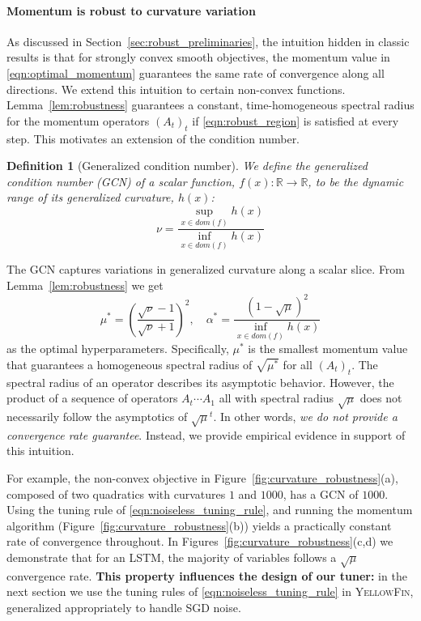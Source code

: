 \documentclass{article}
\newtheorem{definition}[theorem]{Definition}
\newcommand{\mat}[1]{\bm{\mathit{#1}}}
\newcommand{\tuner}{\textsc{YellowFin}\xspace}
\begin{document}
\paragraph{Momentum is robust to curvature variation}
\label{sec:curvature_robustness}

As discussed in Section~\ref{sec:robust_preliminaries}, the intuition hidden in classic results
is that for strongly convex smooth objectives, the momentum value in \eqref{eqn:optimal_momentum} guarantees the same rate of convergence along all directions. 
We extend this intuition to certain non-convex functions.
Lemma~\ref{lem:robustness} guarantees a constant, time-homogeneous spectral radius for the momentum operators $(\mat{A}_t)_t$ if 
\eqref{eqn:robust_region} is satisfied at every step. 
This motivates an extension of the condition number.
\begin{definition}[Generalized condition number]
We define the generalized condition number (GCN) of a scalar function, $f(x):\mathbb{R}\rightarrow \mathbb{R}$, to be the dynamic range of its generalized curvature, $h(x)$:
\begin{equation}
	\nu = \frac{\sup_{x \in dom(f)} h(x)}{ \inf_{x \in dom(f)} h(x)}
\end{equation}
\end{definition}
The GCN captures variations in generalized curvature along a scalar slice.
From Lemma~\ref{lem:robustness} we get
\begin{equation}
	\mu^* = \left(\frac{\sqrt{\nu}-1}{\sqrt{\nu}+1}\right)^2,
	\quad
	\alpha^* = \frac{(1-\sqrt{\mu})^2}{\inf_{x \in dom(f)}h(x)}
	\label{eqn:noiseless_tuning_rule}
\end{equation}
as the optimal hyperparameters. 
Specifically, $\mu^*$ is the smallest momentum value that guarantees a homogeneous spectral radius of $\sqrt{\mu^*}$ for all $(\mat{A}_t)_t$.
The spectral radius of an operator describes its asymptotic behavior. 
However, the product of a sequence of operators $\mat{A}_t\cdots\mat{A}_1$ all with spectral radius $\sqrt{\mu}$ does not necessarily follow the asymptotics of $\sqrt{\mu}^t$.
In other words, {\em we do not provide a convergence rate guarantee}.
Instead, we provide empirical evidence in support of this intuition. 


For example, the non-convex objective in Figure~\ref{fig:curvature_robustness}(a),
composed of two quadratics with curvatures $1$ and $1000$, has a GCN of $1000$.
Using the tuning rule of \eqref{eqn:noiseless_tuning_rule}, and running the momentum algorithm (Figure~\ref{fig:curvature_robustness}(b)) yields a practically constant rate of convergence throughout.
In Figures~\ref{fig:curvature_robustness}(c,d) we demonstrate that for an LSTM,
the majority of variables follows a $\sqrt{\mu}$ convergence rate.
\textbf{This property influences the design of our tuner:}
in the next section we use the tuning rules of \eqref{eqn:noiseless_tuning_rule} in \tuner,
generalized appropriately to handle SGD noise.
\end{document}
